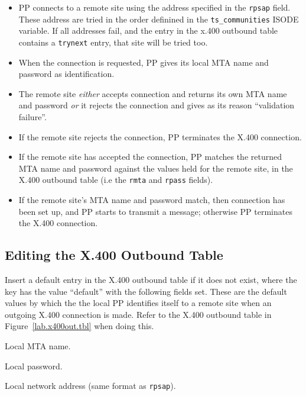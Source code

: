 \begin{itemize}
\item PP connects to a remote site using the address specified in the
\verb|rpsap| field.  These address are tried in the order definined in
the \verb|ts_communities| ISODE variable.
If all addresses fail, and the entry in the x.400 outbound table
contains a \verb|trynext| entry, that site will be tried too.

\item When the connection is requested, PP gives its local MTA name 
and password as identification.

\item The remote site {\em either} accepts connection and returns 
its own MTA name and password {\em or} it rejects the connection and
gives as its reason ``validation failure''.

\item If the remote site rejects the connection, PP terminates 
the X.400 connection.

\item If the remote site has accepted the connection, PP 
matches the returned MTA name and password against the values held for
the remote site, in the X.400 outbound table (i.e the \verb|rmta| and
\verb|rpass| fields).

\item If the remote site's MTA name and password match, then
connection has been set up, and PP starts to transmit a message;
otherwise PP terminates the X.400 connection.
\end{itemize}
 
\subsection{Editing the X.400 Outbound Table} 

Insert a default entry in the X.400 outbound table if it does not
exist, where the key has the value ``default'' with the following
fields set.  These are the default values by which the the local PP
identifies itself to a remote site when an outgoing X.400 connection
is made.  Refer to the X.400 outbound table in
Figure~\ref{lab.x400out.tbl} when doing this.
\begin{describe}
\item[\verb|lmta|:] Local MTA name.
\item[\verb|lpass|:] Local password.
\item[\verb|lpsap|:] Local network address (same format as \verb|rpsap|).
\end{describe}

